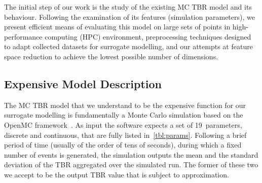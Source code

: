 The initial step of our work is the study of the existing MC TBR model and its
behaviour. Following the examination of its features (simulation parameters), we
present efficient means of evaluating this model on large sets of points in
high-performance computing (HPC) environment, preprocessing techniques designed
to adapt collected datasets for surrogate modelling, and our attempts at feature
space reduction to achieve the lowest possible number of dimensions.


\subsection{Expensive Model Description}
\label{sec:expensive-model-description}

The MC TBR model that we understand to be the expensive function for our
surrogate modelling is fundamentally a Monte Carlo simulation based on the
OpenMC framework~\cite{ROMANO201590}. As input the software expects a set of 19~parameters, discrete and
continuous, that are fully listed in~\cref{tbl:params}. Following a brief period of
time (usually of the order of tens of seconds), during which a fixed number of
events is generated, the simulation outputs the
mean and the standard deviation of the TBR aggregated over the simulated run. The
former of these two we accept to be the output TBR value that is subject
to approximation.

